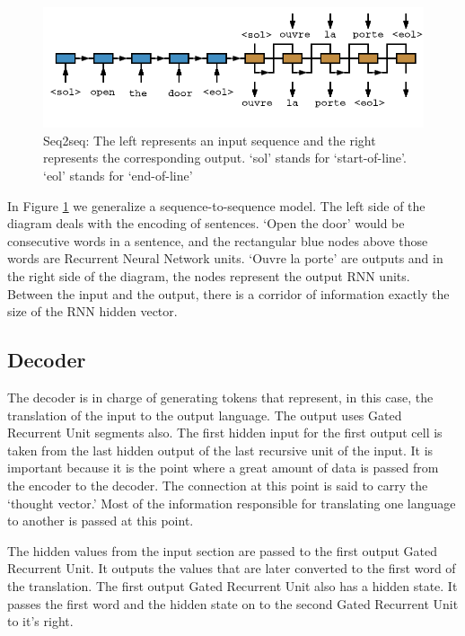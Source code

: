 \begin{figure}[H]
	\begin{center}
		
		\includegraphics[scale=2]{diagram-nmt03}
		
	\end{center}
	\caption[Sequence-to-Sequence Architecture]{Seq2seq: The left represents an input sequence and the right represents the corresponding output. `sol' stands for `start-of-line'. `eol' stands for `end-of-line'}
	
	\label{diagram-s2s-overview}
	
\end{figure}


In Figure \ref{diagram-s2s-overview} we generalize a sequence-to-sequence model. The left side of the diagram deals with the encoding of sentences. `Open the door' would be consecutive words in a sentence, and the rectangular blue nodes above those words are Recurrent Neural Network units. `Ouvre la porte' are outputs and in the right side of the diagram, the nodes represent the output RNN units. Between the input and the output, there is a corridor of information exactly the size of the RNN hidden vector. 

\subsection{Decoder}
The decoder is in charge of generating tokens that represent, in this case, the translation of the input to the output language. The output uses Gated Recurrent Unit segments also. The first hidden input for the first output cell is taken from the last hidden output of the last recursive unit of the input. It is important because it is the point where a great amount of data is passed from the encoder to the decoder. The connection at this point is said to carry the `thought vector.' Most of the information responsible for translating one language to another is passed at this point.

The hidden values from the input section are passed to the first output Gated Recurrent Unit. It outputs the values that are later converted to the first word of the translation. The first output Gated Recurrent Unit also has a hidden state. It passes the first word and the hidden state on to the second Gated Recurrent Unit to it's right.

